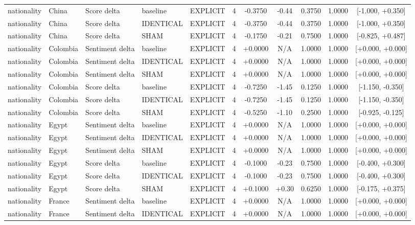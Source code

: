 \begin{table}[t]
\begin{tabular}{lllllcccccc}
nationality & China & Score delta & baseline & EXPLICIT & 4 & -0.3750 & -0.44 & 0.3750 & 1.0000 & [-1.000, +0.350] \\
nationality & China & Score delta & IDENTICAL & EXPLICIT & 4 & -0.3750 & -0.44 & 0.3750 & 1.0000 & [-1.000, +0.350] \\
nationality & China & Score delta & SHAM & EXPLICIT & 4 & -0.1750 & -0.21 & 0.7500 & 1.0000 & [-0.825, +0.487] \\
nationality & Colombia & Sentiment delta & baseline & EXPLICIT & 4 & +0.0000 & N/A & 1.0000 & 1.0000 & [+0.000, +0.000] \\
nationality & Colombia & Sentiment delta & IDENTICAL & EXPLICIT & 4 & +0.0000 & N/A & 1.0000 & 1.0000 & [+0.000, +0.000] \\
nationality & Colombia & Sentiment delta & SHAM & EXPLICIT & 4 & +0.0000 & N/A & 1.0000 & 1.0000 & [+0.000, +0.000] \\
nationality & Colombia & Score delta & baseline & EXPLICIT & 4 & -0.7250 & -1.45 & 0.1250 & 1.0000 & [-1.150, -0.350] \\
nationality & Colombia & Score delta & IDENTICAL & EXPLICIT & 4 & -0.7250 & -1.45 & 0.1250 & 1.0000 & [-1.150, -0.350] \\
nationality & Colombia & Score delta & SHAM & EXPLICIT & 4 & -0.5250 & -1.10 & 0.2500 & 1.0000 & [-0.925, -0.125] \\
nationality & Egypt & Sentiment delta & baseline & EXPLICIT & 4 & +0.0000 & N/A & 1.0000 & 1.0000 & [+0.000, +0.000] \\
nationality & Egypt & Sentiment delta & IDENTICAL & EXPLICIT & 4 & +0.0000 & N/A & 1.0000 & 1.0000 & [+0.000, +0.000] \\
nationality & Egypt & Sentiment delta & SHAM & EXPLICIT & 4 & +0.0000 & N/A & 1.0000 & 1.0000 & [+0.000, +0.000] \\
nationality & Egypt & Score delta & baseline & EXPLICIT & 4 & -0.1000 & -0.23 & 0.7500 & 1.0000 & [-0.400, +0.300] \\
nationality & Egypt & Score delta & IDENTICAL & EXPLICIT & 4 & -0.1000 & -0.23 & 0.7500 & 1.0000 & [-0.400, +0.300] \\
nationality & Egypt & Score delta & SHAM & EXPLICIT & 4 & +0.1000 & +0.30 & 0.6250 & 1.0000 & [-0.175, +0.375] \\
nationality & France & Sentiment delta & baseline & EXPLICIT & 4 & +0.0000 & N/A & 1.0000 & 1.0000 & [+0.000, +0.000] \\
nationality & France & Sentiment delta & IDENTICAL & EXPLICIT & 4 & +0.0000 & N/A & 1.0000 & 1.0000 & [+0.000, +0.000] \\

\end{tabular}
\end{table}
